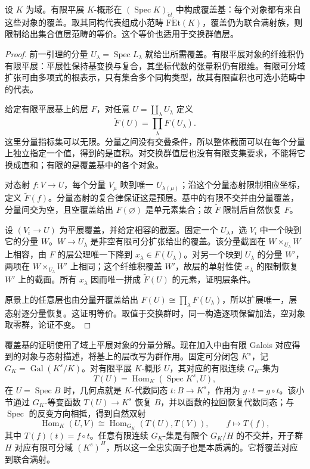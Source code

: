 \begin{proposition}\label{b4:prop:field-finite-etale-basis}
	设 \(K\) 为域。有限平展 \(K\)-概形在 \((\operatorname{Spec}K)_{\acute{e}t}\) 中构成覆盖基：每个对象都有来自这些对象的覆盖。取其同构代表组成小范畴 \(\mathrm{F\acute Et}(K)\)，覆盖仍为联合满射族，则限制给出集合值层范畴的等价。这个等价也适用于交换群值层。
\end{proposition}
\begin{proof}
	前一引理的分量 \(U_\lambda=\operatorname{Spec}L_\lambda\) 就给出所需覆盖。有限平展对象的纤维积仍有限平展：平展性保持基变换与复合，其坐标代数的张量积仍有限维。有限可分域扩张可由多项式的根表示，只有集合多个同构类型，故其有限直积也可选小范畴中的代表。

	给定有限平展基上的层 \(F\)，对任意 \(U=\coprod_\lambda U_\lambda\) 定义
	\[
		\widetilde F(U)=\prod_\lambda F(U_\lambda).
	\]
	这里分量指标集可以无限。分量之间没有交叠条件，所以整体截面可以在每个分量上独立指定一个值，得到的是直积。对交换群值层也没有有限支集要求，不能将它换成直和；有限的是覆盖基中的各个对象。

	对态射 \(f:V\rightarrow U\)，每个分量 \(V_\mu\) 映到唯一 \(U_{\lambda(\mu)}\)；沿这个分量态射限制相应坐标，定义 \(\widetilde F(f)\)。分量态射的复合律保证这是预层。基中的有限不交并由分量覆盖，分量间交为空，且空覆盖给出 \(F(\varnothing)\) 是单元素集合；故 \(\widetilde F\) 限制后自然恢复 \(F\)。

	设 \((V_i\rightarrow U)\) 为平展覆盖，并给定相容的截面。固定一个 \(U_\lambda\)，选 \(V_i\) 中一个映到它的分量 \(W\)。\(W\rightarrow U_\lambda\) 是非空有限可分扩张给出的覆盖。该分量截面在 \(W\times_{U_\lambda}W\) 上相容，由 \(F\) 的层公理唯一下降到 \(x_\lambda\in F(U_\lambda)\)。对另一个映到 \(U_\lambda\) 的分量 \(W'\)，两项在 \(W\times_{U_\lambda}W'\) 上相同；这个纤维积覆盖 \(W'\)，故层的单射性使 \(x_\lambda\) 的限制恢复 \(W'\) 上的截面。所有 \(x_\lambda\) 因而唯一拼成 \(\widetilde F(U)\) 的元素，证明层条件。

	原景上的任意层也由分量开覆盖给出 \(F(U)\cong\prod_\lambda F(U_\lambda)\)，所以扩展唯一，层态射逐分量恢复。这证明等价。取值于交换群时，同一构造逐项保留加法，空对象取零群，论证不变。
\end{proof}

覆盖基的证明使用了域上平展对象的分量分解。现在加入中由有限 Galois 对应得到的对象与态射描述，将基上的层改写为群作用。固定可分闭包 \(K^s\)，记 \(G_K=\operatorname{Gal}(K^s/K)\)。对有限平展 \(K\)-概形 \(U\)，其对应的有限连续 \(G_K\)-集为
\[
	T(U)=\operatorname{Hom}_K(\operatorname{Spec}K^s,U),
\]
在 \(U=\operatorname{Spec}B\) 时，几何点就是 \(K\)-代数同态 \(t:B\rightarrow K^s\)，作用为 \(g\cdot t=g\circ t\)。该小节通过 \(G_K\)-等变函数 \(T(U)\rightarrow K^s\) 恢复 \(B\)，并以函数的拉回恢复代数同态；与 \(\operatorname{Spec}\) 的反变方向相抵，得到自然双射
\[
	\operatorname{Hom}_K(U,V) \cong\operatorname{Hom}_{G_K}(T(U),T(V)), \qquad f\longmapsto T(f),
\]
其中 \(T(f)(t)=f\circ t\)。任意有限连续 \(G_K\)-集是有限个 \(G_K/H\) 的不交并，开子群 \(H\) 对应有限可分域 \((K^s)^H\)，所以这一全忠实函子也是本质满的。它将覆盖对应到联合满射。

